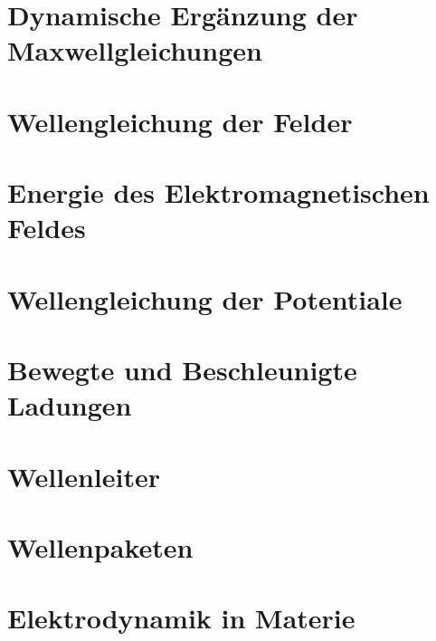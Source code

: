 \section{Dynamische Ergänzung der Maxwellgleichungen}%
\label{sec:dynamische-ergaenzungen}


\newpage
\section{Wellengleichung der Felder}%
\label{sec:wellengleichung}


\newpage
\section{Energie des Elektromagnetischen Feldes}%
\label{sec:energie-EM-feld}

\newpage
\section{Wellengleichung der Potentiale}%
\label{sec:Wellengleichung-}

\newpage
\section{Bewegte und Beschleunigte Ladungen}%
\label{sec:Bewegte und Beschleunigte Ladungen}

\newpage
\section{Wellenleiter}%
\label{sec:Wellenleiter}

\newpage
\section{Wellenpaketen}%
\label{sec:Wellenpaketen}

\newpage
\section{Elektrodynamik in Materie}%
\label{sec:Elektrodynamik in Materie}
